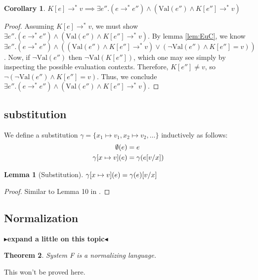\documentclass[twoside,11pt,openright]{report}
\newtheorem{theorem}{Theorem}
\newtheorem{corollary}{Corollary}[theorem]
\newtheorem{lemma}[theorem]{Lemma}
\theoremstyle{definition}
\newcommand{\var}{x}
\newcommand{\expr}{e}
\newcommand{\val}{v}
\newcommand{\elctx}{K}
\newcommand{\subst}[3]{#1{\left[#3 \middle/ #2 \right]}}
\newcommand{\stepS}{\rightarrow^*}
\newcommand{\Val}[1]{\mathrm{Val}(#1)}
\newcommand{\map}[2]{#1 \mapsto #2}
\newcommand{\todo}[1]{{\color[rgb]{.5,0,0}\textbf{$\blacktriangleright$#1$\blacktriangleleft$}}}
\begin{document}
\begin{corollary}\label{cor:EuC_val}
  $\elctx[\expr] \stepS \val \implies \exists \expr'' . (\expr \stepS \expr'') \land (\Val{\expr''} \land \elctx[\expr''] \stepS \val)$
\end{corollary}
\begin{proof}
  Assuming $\elctx[\expr] \stepS \val$, we must show $\exists \expr'' . (\expr \stepS \expr'') \land (\Val{\expr''} \land \elctx[\expr''] \stepS \val)$.
  By lemma \ref*{lem:EuC}, we know $\exists \expr'' . (\expr \stepS \expr'') \land ((\Val{\expr''} \land \elctx[\expr''] \stepS \val) \lor
  (\neg \Val{\expr''} \land \elctx[\expr''] = \val))$. Now, if $\neg \Val{\expr''}$ then $\neg \Val{\elctx[\expr'']}$, which one may see simply by inspecting the possible evaluation contexts. Therefore, $\elctx[\expr''] \neq \val$, so $\neg(\neg \Val{\expr''} \land \elctx[\expr''] = \val)$. Thus, we conclude $\exists \expr'' . (\expr \stepS \expr'') \land (\Val{\expr''} \land \elctx[\expr''] \stepS \val)$.
\end{proof}

\subsection{substitution}
We define a substitution $\gamma = \{\map{\var_1}{\val_1}, \map{\var_2}{\val_2}, \dots\}$ inductively as follows:
\begin{align*}
  \emptyset(\expr) &= \expr\\
  \gamma[\map{\var}{\val}](\expr) &= \gamma(\subst{\expr}{\var}{\val})
\end{align*}

\begin{lemma}[Substitution]\label{lem:sub}
  $\gamma[\map{\var}{\val}](\expr) = \subst{\gamma(\expr)}{\var}{\val}$
\end{lemma}
\begin{proof}
  Similar to Lemma 10 in \cite{DBLP:journals/corr/abs-1907-11133}.
\end{proof}

\subsection{Normalization}
\todo{expand a little on this topic}
\begin{theorem}\label{thm:norm}
  System F is a normalizing language.
\end{theorem}
This won't be proved here.

\end{document}
